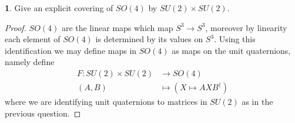 \documentclass[10.5pt]{article}
\theoremstyle{definition}
\newtheorem{pb}{}
\begin{document}
    \begin{pb}
        Give an explicit covering of \(SO(4)\) by \(SU(2) \times SU(2)\).
        \begin{proof}
            \(SO(4)\) are the linear maps which map \(S^3 \to S^3\), moreover by linearity each element of \(SO(4)\) is determined by its values on \(S^3\). Using this identification we may define maps in \(SO(4)\) as maps on the unit quaternions, namely define
            \begin{align*}
                F: SU(2) \times SU(2) &\to SO(4) \\
                (A,B) &\mapsto (X \mapsto AXB^\dagger)
            \end{align*}
            where we are identifying unit quaternions to matrices in \(SU(2)\) as in the previous question.


\end{proof}
\end{pb}
\end{document}

